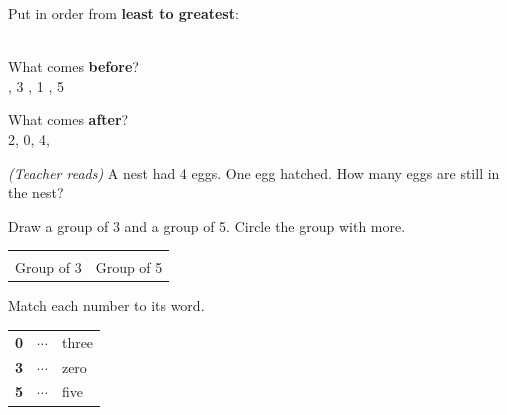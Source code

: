 \documentclass[12pt,letterpaper]{article}
\begin{document}
\vspace{10pt}
\prob Put in order from \textbf{least to greatest}:\\[6pt]
\hspace{2cm}{\Large 5 \quad 2 \quad 0 \quad 4 \quad 1 \quad 3}\\[6pt]
\hspace{2cm}\ansblank\quad\ansblank\quad\ansblank\quad\ansblank\quad\ansblank\quad\ansblank

\vspace{10pt}
\prob What comes \textbf{before}?\\[6pt]
\hspace{1cm}\ansblank, 3 \hspace{2cm} \ansblank, 1 \hspace{2cm} \ansblank, 5

\vspace{10pt}
\prob What comes \textbf{after}?\\[6pt]
\hspace{1cm}2, \ansblank \hspace{2cm} 0, \ansblank \hspace{2cm} 4, \ansblank

\vspace{10pt}
\prob \textit{(Teacher reads)} A nest had 4 eggs.
One egg hatched. How many eggs are still in the nest? \quad\ansblank

\vspace{10pt}
\prob Draw a group of 3 and a group of 5. Circle the group with more.\\[4pt]
\begin{tabular}{cc}
\fbox{\rule{0pt}{2cm}\hspace{4.5cm}} & \fbox{\rule{0pt}{2cm}\hspace{4.5cm}}\\[2pt]
Group of 3 & Group of 5
\end{tabular}

\vspace{10pt}
\prob Match each number to its word.\\[6pt]
\begin{tabular}{p{2cm} p{3cm} p{3cm}}
\textbf{0} & \hspace{0.5cm}$\cdots$ & three \\[6pt]
\textbf{3} & \hspace{0.5cm}$\cdots$ & zero \\[6pt]
\textbf{5} & \hspace{0.5cm}$\cdots$ & five
\end{tabular}
\end{document}
